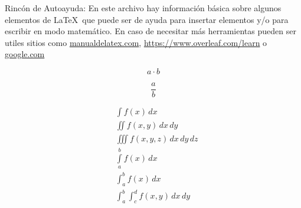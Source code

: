 
Rincón de Autoayuda: En este archivo hay información básica sobre algunos elementos de \LaTeX\, que puede ser de ayuda para insertar elementos y/o para escribir en modo matemático. En caso de necesitar más herramientas pueden ser utiles sitios como \url{manualdelatex.com}, \url{https://www.overleaf.com/learn} o \url{google.com}



%


\begin{equation*}
	a\cdot b
\end{equation*}

\begin{equation*}
	\frac{a}{b}
\end{equation*}

\begin{align*}
	&\int f(x)\,dx\\
        &\iint f(x,y)\,dx\,dy\\
        &\iiint f(x,y,z)\,dx\,dy\,dz\\
        &\int\limits_{a}^{b}f(x)\,dx\\
        &\int_{a}^{b}f(x)\,dx\\
        &\int_{a}^{b}\int_{c}^{d}f(x,y)\,dx\,dy
\end{align*}


